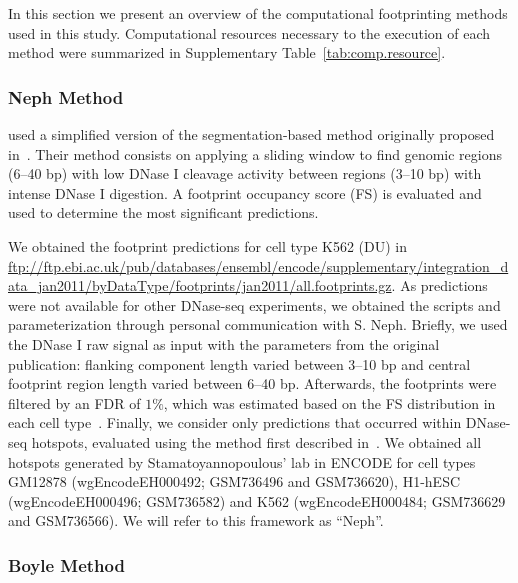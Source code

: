 \documentclass[11pt]{article}
\begin{document}
In this section we present an overview of the computational footprinting methods used in this study. Computational resources necessary to the execution of each method were summarized in Supplementary Table~\ref{tab:comp.resource}.
		
\subsubsection{Neph Method}
\label{sec:neph}

\cite{neph2012a} used a simplified version of the segmentation-based method originally proposed in~\cite{hesselberth2009}. Their method consists on applying a sliding window to find genomic regions (6--40 bp) with low DNase I cleavage activity between regions (3--10 bp) with intense DNase I digestion. A footprint occupancy score (FS) is evaluated and used to determine the most significant predictions.

We obtained the footprint predictions for cell type K562 (DU) in \url{ftp://ftp.ebi.ac.uk/pub/databases/ensembl/encode/supplementary/integration_data_jan2011/byDataType/footprints/jan2011/all.footprints.gz}. As predictions were not available for other DNase-seq experiments, we obtained the scripts and parameterization through personal communication with S. Neph. Briefly, we used the DNase I raw signal as input with the parameters from the original publication: flanking component length varied between 3--10 bp and central footprint region length varied between 6--40 bp. Afterwards, the footprints were filtered by an FDR of $1\%$, which was estimated based on the FS distribution in each cell type~\citep{neph2012a}. Finally, we consider only predictions that occurred within DNase-seq hotspots, evaluated using the method first described in~\cite{sabo2004b}. We obtained all hotspots generated by Stamatoyannopoulous' lab in ENCODE for cell types GM12878 (wgEncodeEH000492; GSM736496 and GSM736620), H1-hESC (wgEncodeEH000496; GSM736582) and K562 (wgEncodeEH000484; GSM736629 and GSM736566). We will refer to this framework as ``Neph''.

\subsubsection{Boyle Method}
\label{sec:boyle}
\end{document}
